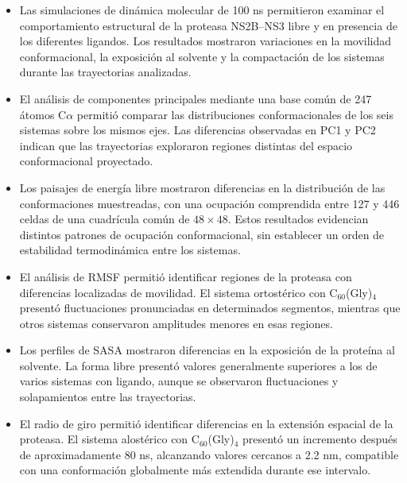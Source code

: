 \begin{itemize}

    \item Las simulaciones de dinámica molecular
    de 100 ns permitieron examinar el
    comportamiento estructural de la proteasa
    NS2B--NS3 libre y en presencia de los
    diferentes ligandos. Los resultados
    mostraron variaciones en la movilidad
    conformacional, la exposición al solvente
    y la compactación de los sistemas
    durante las trayectorias analizadas.

    \item El análisis de componentes principales
    mediante una base común de 247 átomos
    C$\alpha$ permitió comparar las
    distribuciones conformacionales de los
    seis sistemas sobre los mismos ejes.
    Las diferencias observadas en PC1 y PC2
    indican que las trayectorias exploraron
    regiones distintas del espacio
    conformacional proyectado.

    \item Los paisajes de energía libre
    mostraron diferencias en la distribución
    de las conformaciones muestreadas,
    con una ocupación comprendida entre
    127 y 446 celdas de una cuadrícula
    común de $48 \times 48$. Estos
    resultados evidencian distintos
    patrones de ocupación conformacional,
    sin establecer un orden de estabilidad
    termodinámica entre los sistemas.

    \item El análisis de RMSF permitió
    identificar regiones de la proteasa
    con diferencias localizadas de
    movilidad. El sistema ortostérico
    con C$_{60}$(Gly)$_4$ presentó
    fluctuaciones pronunciadas en
    determinados segmentos, mientras
    que otros sistemas conservaron
    amplitudes menores en esas regiones.

    \item Los perfiles de SASA mostraron
    diferencias en la exposición de
    la proteína al solvente. La forma
    libre presentó valores generalmente
    superiores a los de varios sistemas
    con ligando, aunque se observaron
    fluctuaciones y solapamientos
    entre las trayectorias.

    \item El radio de giro permitió
    identificar diferencias en la
    extensión espacial de la proteasa.
    El sistema alostérico con
    C$_{60}$(Gly)$_4$ presentó un
    incremento después de aproximadamente
    80 ns, alcanzando valores cercanos
    a 2.2 nm, compatible con una
    conformación globalmente más extendida
    durante ese intervalo.


\end{itemize}
